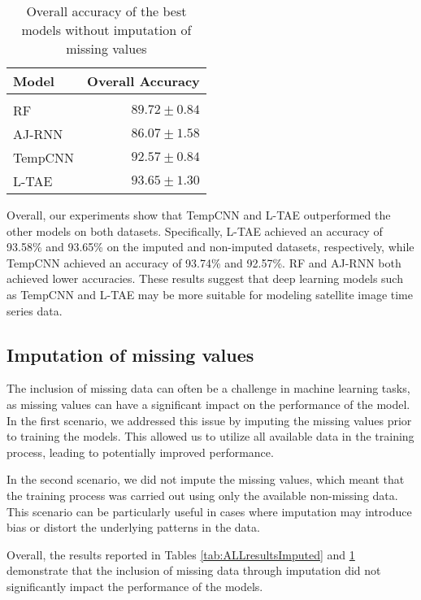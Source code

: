 \begin{table}[H]
  \centering
    \begin{tabular}{lr}
    Model                       & Overall Accuracy             \\[0.2cm] 
    \hline \\[-0.2cm]
    RF      & $89.72 \pm 0.84$\\
    AJ-RNN  & $86.07 \pm 1.58$\\
    TempCNN & $92.57 \pm 0.84$\\
    L-TAE   & $93.65 \pm 1.30$
    \end{tabular}
  \caption{Overall accuracy of the best models without imputation of missing values} 
  \label{tab:ALLresultsNoImputed}
\end{table}

Overall, our experiments show that TempCNN and L-TAE outperformed the other models on both datasets.
Specifically, L-TAE achieved an accuracy of 93.58\% and 93.65\% on the imputed and non-imputed datasets, respectively, 
while TempCNN achieved an accuracy of 93.74\% and 92.57\%. RF and AJ-RNN both achieved lower accuracies. 
These results suggest that deep learning models such as TempCNN and L-TAE may be more suitable for modeling satellite image time series data.

\subsection{Imputation of missing values}

The inclusion of missing data can often be a challenge in machine learning tasks, as missing values can have a significant impact on the performance of the model.
In the first scenario, we addressed this issue by imputing the missing values prior to training the models. 
This allowed us to utilize all available data in the training process, leading to potentially improved performance.

In the second scenario, we did not impute the missing values, which meant that the training process was carried out using only the available non-missing data.
This scenario can be particularly useful in cases where imputation may introduce bias or distort the underlying patterns in the data.

Overall, the results reported in Tables \ref{tab:ALLresultsImputed} and \ref{tab:ALLresultsNoImputed} demonstrate that the inclusion of missing data through imputation did not significantly impact the performance of the models.
